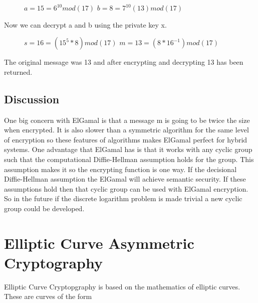 \documentclass[conference]{IEEEtran}
\begin{document}
\begin{figure}[h]
	\begin{center}
		$a= 15 ={6}^{10}mod\left(17\right)$ \newline
		$b= 8  ={7}^{10}\left(13\right)mod\left(17\right)$ \newline
	\end{center}
\end{figure}

Now we can decrypt a and b using the private key x.

\begin{figure}[H]
	\begin{center}
		$s = 16 = \left( {15}^{5} * 8 \right) mod\left(17\right)$ \newline
		$m= 13 = \left(8 * {16}^{-1} \right) mod\left(17\right)$ \newline
	\end{center}
\end{figure}

The original message was 13 and after encrypting and decrypting 13 has been returned.

\subsection{Discussion}
One big concern with ElGamal is that a message m is going to be twice the size when encrypted. It is also slower than a symmetric algorithm for the same level of encryption so these features of algorithms makes ElGamal perfect for hybrid systems. \newline \indent
One advantage that ElGamal has is that it works with any cyclic group such that the computational Diffie-Hellman assumption holds for the group. This assumption makes it so the encrypting function is one way. If the decisional Diffie-Hellman assumption the ElGamal will achieve semantic security. If these assumptions hold then that cyclic group can be used with ElGamal encryption. So in the future if the discrete logarithm problem is made trivial a new cyclic group could be developed.


\section{Elliptic Curve Asymmetric Cryptography}
Elliptic Curve Cryptopgraphy is based on the mathematics of elliptic curves. These are curves of the form
\end{document}
